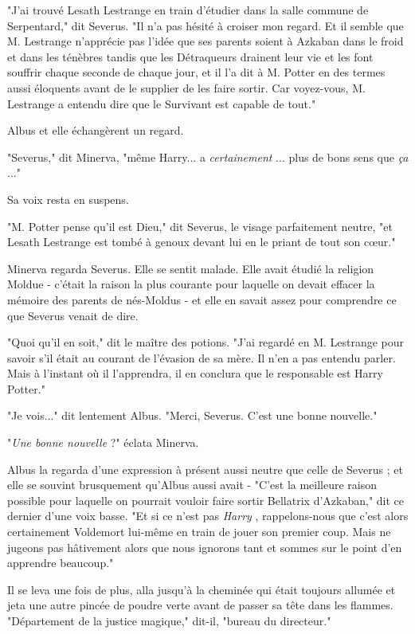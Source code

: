 "J'ai trouvé Lesath Lestrange en train d'étudier dans la salle commune de Serpentard," dit Severus. "Il n'a pas hésité à croiser mon regard. Et il semble que M. Lestrange n'apprécie pas l'idée que ses parents soient à Azkaban dans le froid et dans les ténèbres tandis que les Détraqueurs drainent leur vie et les font souffrir chaque seconde de chaque jour, et il l'a dit à M. Potter en des termes aussi éloquents avant de le supplier de les faire sortir. Car voyez-vous, M. Lestrange a entendu dire que le Survivant est capable de tout."

Albus et elle échangèrent un regard.

"Severus," dit Minerva, "même Harry... a \emph{certainement} ... plus de bons sens que \emph{ça} ..."

Sa voix resta en suspens.

"M. Potter pense qu'il est Dieu," dit Severus, le visage parfaitement neutre, "et Lesath Lestrange est tombé à genoux devant lui en le priant de tout son cœur."

Minerva regarda Severus. Elle se sentit malade. Elle avait étudié la religion Moldue - c'était la raison la plus courante pour laquelle on devait effacer la mémoire des parents de nés-Moldus - et elle en savait assez pour comprendre ce que Severus venait de dire.

"Quoi qu'il en soit," dit le maître des potions. "J'ai regardé en M. Lestrange pour savoir s'il était au courant de l'évasion de sa mère. Il n'en a pas entendu parler. Mais à l'instant où il l'apprendra, il en conclura que le responsable est Harry Potter."

"Je vois..." dit lentement Albus. "Merci, Severus. C'est une bonne nouvelle."

"\emph{Une bonne nouvelle}  ?" éclata Minerva.

Albus la regarda d'une expression à présent aussi neutre que celle de Severus ; et elle se souvint brusquement qu'Albus aussi avait - "C'est la meilleure raison possible pour laquelle on pourrait vouloir faire sortir Bellatrix d'Azkaban," dit ce dernier d'une voix basse. "Et si ce n'est pas \emph{Harry} , rappelons-nous que c'est alors certainement Voldemort lui-même en train de jouer son premier coup. Mais ne jugeons pas hâtivement alors que nous ignorons tant et sommes sur le point d'en apprendre beaucoup."

Il se leva une fois de plus, alla jusqu'à la cheminée qui était toujours allumée et jeta une autre pincée de poudre verte avant de passer sa tête dans les flammes. "Département de la justice magique," dit-il, "bureau du directeur."

